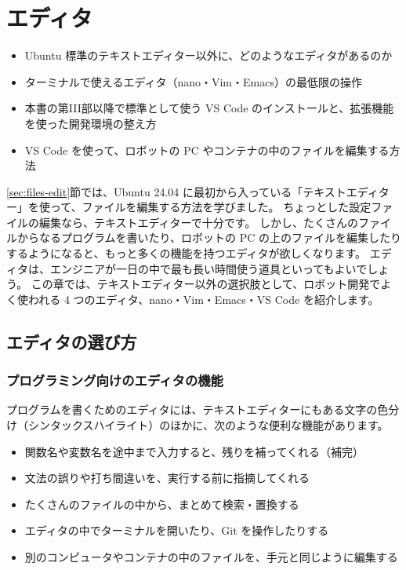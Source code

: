 \chapter{エディタ}
\label{chap:editor}

\begin{goalbox}
  \begin{itemize}
    \item Ubuntu 標準のテキストエディター以外に、どのようなエディタがあるのか
    \item ターミナルで使えるエディタ（nano・Vim・Emacs）の最低限の操作
    \item 本書の第III部以降で標準として使う VS Code のインストールと、拡張機能を使った開発環境の整え方
    \item VS Code を使って、ロボットの PC やコンテナの中のファイルを編集する方法
  \end{itemize}
\end{goalbox}

\ref{sec:files-edit}節では、Ubuntu 24.04 に最初から入っている「テキストエディター」を使って、ファイルを編集する方法を学びました。
ちょっとした設定ファイルの編集なら、テキストエディターで十分です。
しかし、たくさんのファイルからなるプログラムを書いたり、ロボットの PC の上のファイルを編集したりするようになると、もっと多くの機能を持つエディタが欲しくなります。
エディタは、エンジニアが一日の中で最も長い時間使う道具といってもよいでしょう。
この章では、テキストエディター以外の選択肢として、ロボット開発でよく使われる 4 つのエディタ、nano・Vim・Emacs・VS Code を紹介します。

\section{エディタの選び方}
\label{sec:editor-intro}

\subsection{プログラミング向けのエディタの機能}

プログラムを書くためのエディタには、テキストエディターにもある文字の色分け（シンタックスハイライト）のほかに、次のような便利な機能があります。

\begin{itemize}
  \item 関数名や変数名を途中まで入力すると、残りを補ってくれる（補完）
  \item 文法の誤りや打ち間違いを、実行する前に指摘してくれる
  \item たくさんのファイルの中から、まとめて検索・置換する
  \item エディタの中でターミナルを開いたり、Git を操作したりする
  \item 別のコンピュータやコンテナの中のファイルを、手元と同じように編集する
\end{itemize}


